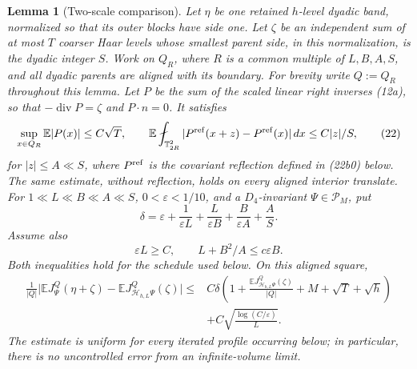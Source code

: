 \documentclass{aomart}
\newtheorem{lemma}[theorem]{Lemma}
\theoremstyle{definition}
\newcommand{\1}{\mathbf 1}
\begin{document}
\begin{lemma}[Two-scale comparison]\label{lem:two-scale-scalarization}
Let $\eta$ be one retained $h$-level dyadic band, normalized so that
its outer blocks have side one. Let $\zeta$ be an independent sum of
at most $T$ coarser Haar levels whose smallest parent side, in this
normalization, is the dyadic integer $S$.  Work on $Q_ R$, where
$R$ is a common multiple of $L,B,A,S$, and all dyadic parents are
aligned with its boundary.  For brevity write $Q:=Q_R$ throughout this
lemma.  Let $P$ be the sum of the scaled linear
right inverses (12a), so that
$-\operatorname {div}P=\zeta$ and $P\cdot n=0$. It satisfies
\begin{equation}
\sup_ {x\in Q_ R}\mathbb E|P(x)|\leq C\sqrt T,\qquad
\mathbb E\fint_ {\mathbb T_ {2R}^2}
|P^{\rm ref}(x+z)-P^{\rm ref}(x)|\,dx\leq C|z|/S,
\tag{22}
\end{equation}
for $|z|\leq A\ll S$, where $P^{\rm ref}$ is the covariant
reflection defined in (22b0) below.  The same estimate, without
reflection, holds on every aligned interior translate.
For $1\ll L\ll B\ll A\ll S$, $0<\varepsilon<1/10$, and a
$D_ 4$-invariant $\Psi\in\mathscr P_ M$, put
\begin{equation}
\delta=\varepsilon+\frac1{\varepsilon L}
+\frac{L}{\varepsilon B}+\frac{B}{\varepsilon A}+\frac AS.
\tag{23}
\end{equation}
Assume also
\begin{equation}
\varepsilon L\geq C,\qquad L+B^2/A\leq c\varepsilon B.
\tag{23a}
\end{equation}
Both inequalities hold for the schedule used below.
On this aligned square,
\begin{equation}
\begin{split}
\frac1{|Q|}\bigl|\mathbb EJ_ \Psi^Q(\eta+\zeta)
-\mathbb EJ_ {\mathcal H_ {h,L}\Psi}^Q(\zeta)\bigr|
\leq {}&C\delta\left(
1+\frac{\mathbb EJ_ {\mathcal H_ {h,L}\Psi}^Q(\zeta)}{|Q|}
+M+\sqrt T+\sqrt h\right)\\
&+C\sqrt{\frac{\log(C/\varepsilon)}L}.                            
\end{split}
\tag{24}
\label{eq:two-scale-scalarization}
\end{equation}
The estimate is uniform for every iterated profile occurring below; in
particular, there is no uncontrolled error from an infinite-volume limit.

\end{lemma}
\end{document}
